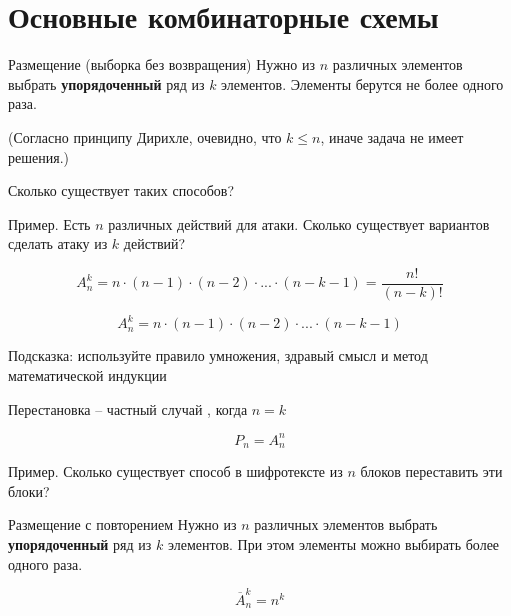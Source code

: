 \section{Основные комбинаторные схемы}\label{section:main_combinatorics_sxems}


\begin{frame}{Размещение (выборка без возвращения)}
Нужно из
$n$
различных элементов 
выбрать \textbf{упорядоченный}
ряд из $k$
элементов. 
Элементы берутся не более одного раза.

(Согласно принципу Дирихле, очевидно, что $k \leqslant n$,
иначе задача не имеет решения.)


Сколько существует таких способов?   

Пример.
Есть $n$ различных действий для атаки.
Сколько существует вариантов сделать атаку из $k$ действий?

\begin{equation}
A_n^k = n \cdot (n-1) \cdot (n-2) \cdot ... \cdot (n-k-1) = \frac{n!} {\left(n-k\right)!}
\end{equation}    


\end{frame}

\begin{frame}


\begin{equation}
A_n^k = n \cdot (n-1) \cdot (n-2) \cdot ... \cdot (n-k-1)
\end{equation}  

Подсказка: используйте правило умножения, здравый смысл 
и метод математической индукции

\end{frame}



\begin{frame}{Перестановка}
 -- 
частный случай , 
когда $n=k$ 

\begin{equation}
P_n = A_n^n
\end{equation}

Пример. Сколько существует способ в шифротексте из $n$ блоков переставить эти блоки?
\end{frame}


\begin{frame}{Размещение с повторением}
Нужно из
$n$
различных элементов 
выбрать \textbf{упорядоченный}
ряд из $k$
элементов. 
При этом элементы можно выбирать более одного раза.

\begin{equation}
\overline{A}_n^k = n ^ k
\end{equation} 

\end{frame}

